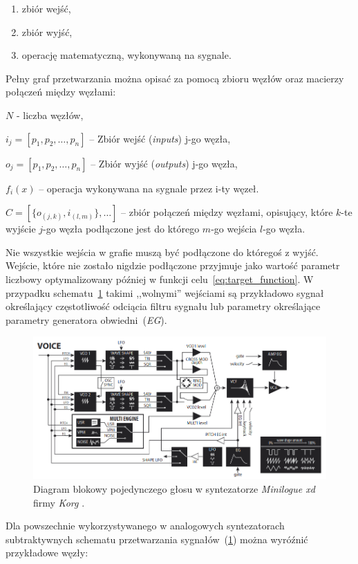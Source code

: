 \begin{enumerate}
  \item zbiór wejść,
  \item zbiór wyjść,
  \item operację matematyczną, wykonywaną na sygnale.
\end{enumerate}

Pełny graf przetwarzania można opisać za pomocą zbioru węzłów oraz
macierzy połączeń między węzłami:

$N$ - liczba węzłów,

$i_{j} = [ p_1, p_2, \ldots, p_n ]$ -- Zbiór wejść (\textit{inputs}) j-go węzła,

$o_{j} = [ p_1, p_2, \ldots, p_n ]$ -- Zbiór wyjść (\textit{outputs}) j-go węzła,

$f_i(x)$ -- operacja wykonywana na sygnale przez i-ty węzeł.

$C = [ \{ o_{(j, k)}, i_{(l, m)} \}, \ldots ] $ -- zbiór połączeń między węzłami, opisujący, które 
$k$-te wyjście $j$-go węzła podłączone jest do którego $m$-go wejścia $l$-go węzła.

Nie wszystkie wejścia w grafie muszą być podłączone do któregoś z wyjść.
Wejście, które nie zostało nigdzie podłączone przyjmuje jako wartość parametr 
liczbowy optymalizowany później w funkcji celu~\ref{eq:target_function}.
W przypadku schematu~\ref{fig:minilogue_diagram} takimi ,,wolnymi'' wejściami są przykładowo
sygnał określający częstotliwość odciącia filtru sygnału lub parametry określające parametry
generatora obwiedni~(\textit{EG}).


\begin{figure}[H]
    \centering
    \includegraphics[width=0.8\linewidth]{rys01/minilogue_voice_block_diagram.png}
    \caption{
      Diagram blokowy pojedynczego głosu w syntezatorze 
      \textit{Minilogue xd} firmy \textit{Korg} \cite{minilogue_diagram}.
    }
    \label{fig:minilogue_diagram}
\end{figure}

Dla powszechnie wykorzystywanego w analogowych syntezatorach subtraktywnych 
schematu przetwarzania sygnałów~(\ref{fig:minilogue_diagram}) można wyróźnić przykładowe węzły: \\

